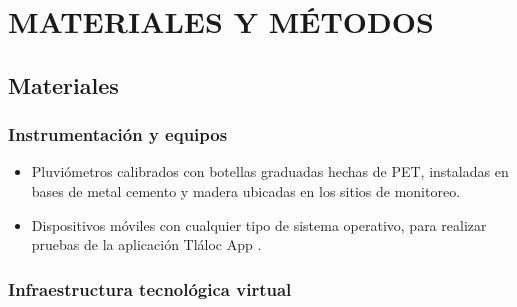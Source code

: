 \chapter{MATERIALES Y MÉTODOS}


\section{Materiales}
\subsection{Instrumentación y equipos}
\begin{itemize}
    \item Pluviómetros calibrados con botellas graduadas hechas de PET, instaladas en bases de metal cemento y madera ubicadas en los sitios de monitoreo.
    \item Dispositivos móviles con cualquier tipo de sistema operativo, para realizar pruebas de la aplicación Tláloc App .
\end{itemize}

\subsection{Infraestructura tecnológica virtual}

